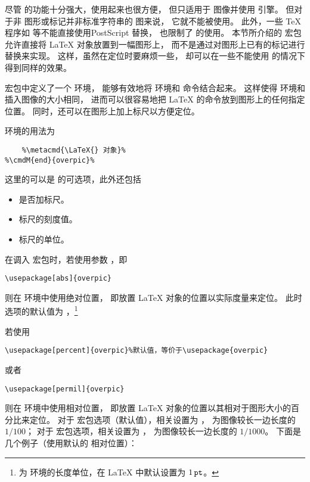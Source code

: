 尽管  的功能十分强大，使用起来也很方便，
但只适用于  图像并使用  引擎。
但对于非  图形或标记并非标准字符串的  图来说，
它就不能被使用。
此外，一些 \TeX{} 程序如  \pdfLaTeX{} 等不能直接使用PostScript 替换，
也限制了  的使用。
本节所介绍的  宏包允许直接将 \LaTeX{} 对象放置到一幅图形上，
而不是通过对图形上已有的标记进行替换来实现。
这样，虽然在定位时要麻烦一些，
却可以在一些不能使用  的情况下得到同样的效果。

 宏包中定义了一个  环境，
能够有效地将  环境和  命令结合起来。
这样使得  环境和插入图像的大小相同，
进而可以很容易地把 \LaTeX{} 的命令放到图形上的任何指定位置。
同时，还可以在图形上加上标尺以方便定位。

 环境的用法为
\begin{lstlisting}[escapechar=\%]
%\cmdMOM{begin}{overpic}{\metacmd{选项}}{\metacmd{图形}}%
	%\metacmd{\LaTeX{} 对象}%
%\cmdM{end}{overpic}%
\end{lstlisting}
这里的可以是  的可选项，此外还包括
\begin{itemize}
	\item {} 是否加标尺。
	\item {} 标尺的刻度值。
	\item {} 标尺的单位。
\end{itemize}

在调入  宏包时，若使用参数 ，即
\begin{lstlisting}
\usepackage[abs]{overpic}
\end{lstlisting}
则在  环境中使用绝对位置，
即放置 \LaTeX{} 对象的位置以实际度量来定位。
此时  选项的默认值为 ，\footnote{%
	 为  环境的长度单位，在 \LaTeX{} 中默认设置为 $1\,\mathtt{pt}$。}


若使用
\begin{lstlisting}
\usepackage[percent]{overpic}%默认值，等价于\usepackage{overpic}
\end{lstlisting}
或者
\begin{lstlisting}
\usepackage[permil]{overpic}
\end{lstlisting}
则在  环境中使用相对位置，
即放置 \LaTeX{} 对象的位置以其相对于图形大小的百分比来定位。
对于  宏包选项（默认值），相关设置为 ，
 为图像较长一边长度的 $1/100$；
对于  宏包选项，相关设置为 ，
 为图像较长一边长度的 $1/1000$。
下面是几个例子（使用默认的  相对位置）：



